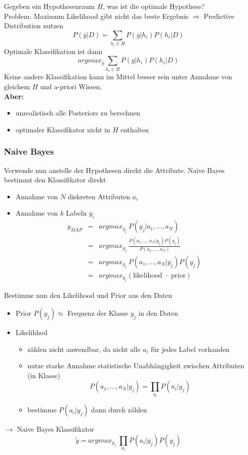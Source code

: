 	Gegeben ein Hypothesenraum $H$, was ist die optimale Hypothese?\\[5pt]
	Problem: Maximum Likelihood gibt nicht das beste Ergebnis $\Rightarrow$ Predictive Distribution nutzen
	\begin{equation*}
		P(\overline{y}\vert D) = \sum_{h_i\in H} P(\overline{y}\vert h_i)P(h_i\vert D)
	\end{equation*}
	Optimale Klassifikation ist dann
	\begin{equation*}
		argmax_{\overline{y}} \sum_{h_i\in H} P(\overline{y}\vert h_i)P(h_i\vert D)
	\end{equation*}
	Keine andere Klassifikation kann im Mittel besser sein unter Annahme von gleichem $H$ und a-priori Wissen.\\[5pt]
	\textbf{Aber:}
	\begin{itemize}
		\item unrealistisch alle Posteriors zu berechnen
		\item optimaler Klassifikator nicht in $H$ enthalten
	\end{itemize}
	\subsubsection{Naive Bayes}
	Verwende nun anstelle der Hypothesen direkt die Attribute. Naive Bayes bestimmt den Klassifikator direkt
	\begin{itemize}
		\item Annahme von $N$ diskreten Attributen $a_i$
		\item Annahme von $k$ Labeln $y_i$
		\begin{eqnarray*}
			y_{MAP} &=& argmax_{y_j}~P(y_j\vert a_1,..., a_N)\\
			&=& argmax_{y_j}~\frac{P(a_1,..., a_N\vert y_j)P(y_j)}{P(a_1,..., a_N)}\\
			&=& argmax_{y_j}~P(a_1,..., a_N\vert y_j)P(y_j)\\
			&=& argmax_{y_j}(\text{likelihood $\cdot$ prior})
		\end{eqnarray*}
	\end{itemize}
	Bestimme nun den Likelihood und Prior aus den Daten
	\begin{itemize}
		\item Prior $P(y_j)\approx$ Frequenz der Klasse $y_j$ in den Daten
		\item Likelihhod
		\begin{itemize}
			\item zählen nicht anwendbar, da nicht alle $a_i$ für jedes Label vorhanden
			\item nutze starke Annahme statistische Unabhängigkeit zwischen Attributen (in Klasse)
			\begin{equation*}
				P(a_1,..., a_N\vert y_j) = \prod_{a_i}P(a_i\vert y_j)
			\end{equation*}
			\item bestimme $P(a_i\vert y_j)$ dann durch zählen
		\end{itemize}
	\end{itemize}
	$\rightarrow$ Naive Bayes Klassifikator
	\begin{equation*}
		\tilde{y} = argmax_{y_j}~\prod_{a_i}P(a_i\vert y_j)P(y_j)
	\end{equation*}
